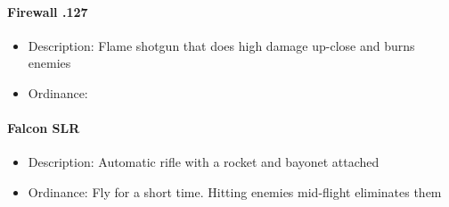 \documentclass[../Main.tex]{subfiles}
\begin{document}
\paragraph{Firewall .127}

\begin{itemize}
	\item Description: Flame shotgun that does high damage up-close and burns enemies
	\item Ordinance: 
\end{itemize} 

\paragraph{Falcon SLR}

\begin{itemize}
	\item Description: Automatic rifle with a rocket and bayonet attached
	\item Ordinance: Fly for a short time. Hitting enemies mid-flight eliminates them
\end{itemize} 
\end{document}
